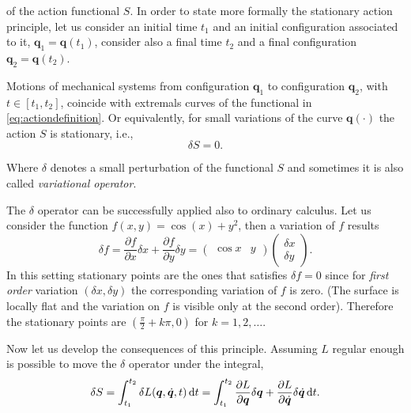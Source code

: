 		of the action functional $S$.
		In order to state more formally the stationary action principle,
		let us consider an initial time $t_{1}$ and an initial configuration
		associated to it, $\bm{q}_{1} = \bm{q}(t_{1})$, consider also a final
		time $t_{2}$ and a final configuration $\bm{q}_{2}=\bm{q}(t_{2})$.
		\begin{theorem}
			\label{th:stationaryaction}
			Motions of mechanical systems from configuration $\bm{q}_{1}$
			to configuration $\bm{q}_{2}$, with $t\in[t_{1},t_{2}]$,
			coincide with extremals curves of the functional in \cref{eq:actiondefinition}.
			Or equivalently, for small variations of the curve $\bm{q}(\cdot)$ the action $S$ is stationary, i.e.,
			\begin{equation}
				\delta S = 0.
			\end{equation}
		\end{theorem}
		Where $\delta$ denotes a small perturbation of the functional
		$S$ and sometimes it is also called \emph{variational operator}.
		\begin{example}
			The $\delta$ operator can be successfully applied also to ordinary calculus.
			Let us consider the function $f(x,y) = \cos(x) + y^2$, then a variation of $f$ results
			\begin{equation*}
				\delta f = \frac{\partial f}{\partial x}\delta x +
				\frac{\partial f}{\partial y}\delta y = \begin{pmatrix} \cos{x} &
			   y \end{pmatrix}\begin{pmatrix}\delta x \\ \delta y \end{pmatrix}.
			\end{equation*}
			In this setting stationary points are the ones that satisfies $\delta f = 0$ 
			since for \emph{first order} variation $(\delta x,\delta y)$ the corresponding
			variation of $f$ is zero.
			(The surface is locally flat and the variation on $f$ is visible only at the second order).
			Therefore the stationary points are $(\frac{\pi}{2}+k\pi,0)$ for $k = 1,2,\dots$.
		\end{example}
		Now let us develop the consequences of this principle.
		Assuming $L$ regular enough is possible to move the $\delta$ operator under the integral,
		\begin{equation}
			\label{eq:actionvariation}
			\delta S = \int_{t_{1}}^{t_{2}}\delta L(\bm{q},\dot{\bm{q}},t) 
			\mathop{}\!\mathrm{d} t = \int_{t_{1}}^{t_{2}}\frac{\partial L}{\partial \bm{q}}
			\delta \bm{q} + \frac{\partial L}{\partial \dot{\bm{q}}}\delta\dot{\bm{q}} \mathop{}\!\mathrm{d} t.  
		\end{equation}
